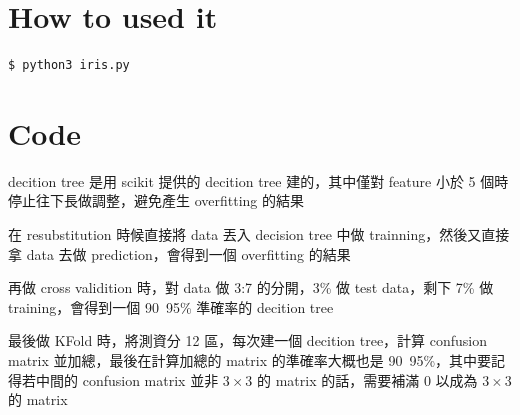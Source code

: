 \documentclass[12pt,a4paper]{article}
\begin{document}
\begin{CJK}{UTF8}{bsmi}
\section{How to used it}
  \begin{lstlisting}[language=bash]
    $ python3 iris.py
  \end{lstlisting}
\section{Code}
  decition tree 是用 scikit 提供的 decition tree 建的，其中僅對 feature 小於 5 個時停止往下長做調整，避免產生 overfitting 的結果

  在 resubstitution 時候直接將 data 丟入 decision tree 中做 trainning，然後又直接拿 data 去做 prediction，會得到一個 overfitting 的結果

  再做 cross validition 時，對 data 做 3:7 的分開，3\% 做 test data，剩下 7\% 做 training，會得到一個 90~95\% 準確率的 decition tree

  最後做 KFold 時，將測資分 12 區，每次建一個 decition tree，計算 confusion matrix 並加總，最後在計算加總的 matrix 的準確率大概也是 90~95\%，其中要記得若中間的 confusion matrix 並非 $3\times3$ 的 matrix 的話，需要補滿 0 以成為 $3\times3$ 的 matrix
\end{CJK}
\end{document}
